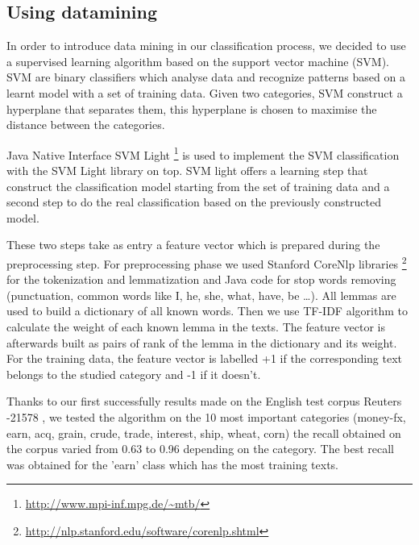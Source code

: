 \documentclass{llncs}
\begin{document}
%
\subsection{Using datamining}

In order to introduce data mining in our classification process, we decided to use a supervised learning algorithm based on the support vector machine (SVM). SVM are binary classifiers which analyse data and recognize patterns based on a learnt model with a set of training data. Given two categories, SVM construct a hyperplane that separates them, this hyperplane is chosen to maximise the distance between the categories.

Java Native Interface SVM Light \footnote{\url{http://www.mpi-inf.mpg.de/~mtb/}} is used to implement the SVM classification with the SVM Light library \cite{joachim:svmlight} on top. SVM light offers a learning step that construct the classification model starting from the set of training data and a second step to do the real classification based on the previously constructed model.

These two steps take as entry a feature vector which is prepared during the preprocessing step. For preprocessing phase we used Stanford CoreNlp libraries \footnote{\url{http://nlp.stanford.edu/software/corenlp.shtml}} for the tokenization and lemmatization and Java code for stop words removing (punctuation, common words like I, he, she, what, have, be …).
All lemmas are used to build a dictionary of all known words. Then we use TF-IDF algorithm to calculate the weight of each known lemma in the texts. The feature vector is afterwards built as pairs of rank of the lemma in the dictionary and its weight. For the training data, the feature vector is labelled +1 if the corresponding text belongs to the studied category and -1 if it doesn't.

Thanks to our first successfully results made on the English test corpus Reuters -21578 \cite{lewis:reuters}, we tested the algorithm on the 10 most important categories (money-fx, earn, acq, grain, crude, trade, interest, ship, wheat, corn) the recall obtained on the corpus varied from 0.63 to 0.96 depending on the category. The best recall was obtained for the 'earn' class which has the most training texts.
\end{document}
